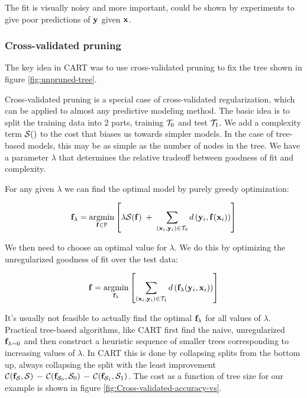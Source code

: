 \documentclass[10pt,openany]{article}
\numberwithin{definition}{section}
\numberwithin{example}{section}
\numberwithin{equation}{section}
\numberwithin{figure}{section}
\begin{document}
The fit is visually noisy and more important, could be shown by experiments
to give poor predictions of ${\mathbf y}$ given ${\mathbf x}$.


\subsubsection{Cross-validated pruning}

The key idea in CART was to use cross-validated pruning to fix the
tree shown in figure \ref{fig:unpruned-tree}.

Cross-validated pruning is a special case of cross-validated regularization,
which can be applied to almost any predictive modeling method. The
basic idea is to split the training data into 2 parts, training $\mathcal{T}_{0}$
and test $\mathcal{T}_{1}.$ We add a complexity term $\mathcal{S}()$ to the
cost that biases us towards simpler models. In the case of tree-based
models, this may be as simple as the number of nodes in the tree.
We have a parameter $\lambda$ that determines the relative tradeoff
between goodness of fit and complexity. 

For any given $\lambda$ we can find the optimal model by purely greedy
optimization:

\begin{equation}
{\mathbf f}_{\lambda}=\operatorname*{argmin}_{{\mathbf f}\in\mathbb{F}}\left[\lambda\mathcal{S}({\mathbf f})\;+\;\sum_{({\mathbf x}_{i},{\mathbf y}_{i})\in\mathcal{T}_{0}}d\left({\mathbf y}_{i},{\mathbf f}({\mathbf x}_{i})\right)\right]
\end{equation}


We then need to choose an optimal value for $\lambda$. We do this
by optimizing the unregularized goodness of fit over the test data:

\begin{equation}
{\mathbf f}=\operatorname*{argmin}_{{\mathbf f}_{\lambda}}\left[\sum_{({\mathbf x}_{i},{\mathbf y}_{i})\in\mathcal{T}_{1}}d\left({\mathbf f}_{\lambda}({\mathbf y}_{i},{\mathbf x}_{i})\right)\right]
\end{equation}


It's usually not feasible to actually find the optimal ${\mathbf f}_{\lambda}$
for all values of $\lambda.$ Practical tree-based algorithms, like
CART first find the naive, unregularized ${\mathbf f}_{\lambda=0}$ and then
construct a heuristic sequence of smaller trees corresponding to increasing
values of $\lambda$. In CART this is done by collapsing splits from
the bottom up, always collapsing the split with the least improvement
$\mathcal{C}({\mathbf f}_{\mathcal{S}},\mathcal{S})\,-\,\mathcal{C}({\mathbf f}_{\mathcal{S}_{0}},\mathcal{S}_{0})\,-\,\mathcal{C}({\mathbf f}_{\mathcal{S}_{1}},\mathcal{S}_{1})$.
The cost as a function of tree size for our example is shown in figure
\ref{fig:Cross-validated-accuracy-vs}.
\end{document}
